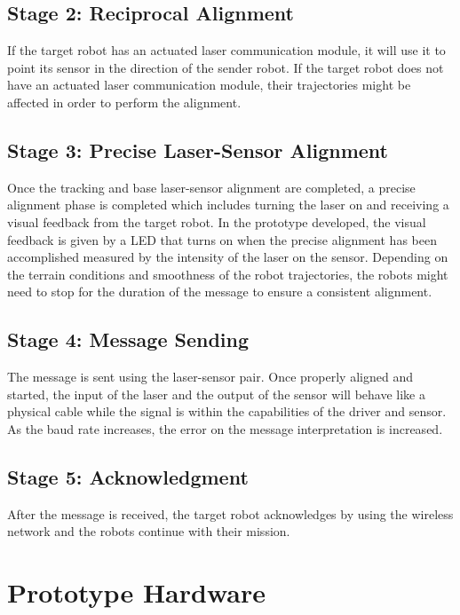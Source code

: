 \documentclass[botnum, fleqn]{unmeethesis}
\begin{document}
\subsection*{Stage 2: Reciprocal Alignment}

If the target robot has an actuated laser communication module, it will use it to point its sensor in the direction of the sender robot. If the target robot does not have an actuated laser communication module, their trajectories might be affected in order to perform the alignment. 

\subsection*{Stage 3: Precise Laser-Sensor Alignment}

Once the tracking and base laser-sensor alignment are completed, a precise alignment phase is completed which includes turning the laser on and receiving a visual feedback from the target robot. In the prototype developed, the visual feedback is given by a LED that turns on when the precise alignment has been accomplished measured by the intensity of the laser on the sensor. Depending on the terrain conditions and smoothness of the robot trajectories, the robots might need to stop for the duration of the message to ensure a consistent alignment.

\subsection*{Stage 4: Message Sending}

The message is sent using the laser-sensor pair. Once properly aligned and started, the input of the laser and the output of the sensor will behave like a physical cable while the signal is within the capabilities of the driver and sensor. As the baud rate increases, the error on the message interpretation is increased.

\subsection*{Stage 5: Acknowledgment}

After the message is received, the target robot acknowledges by using the wireless network and the robots continue with their mission.

\section*{Prototype Hardware}\label{chp:}
\end{document}
